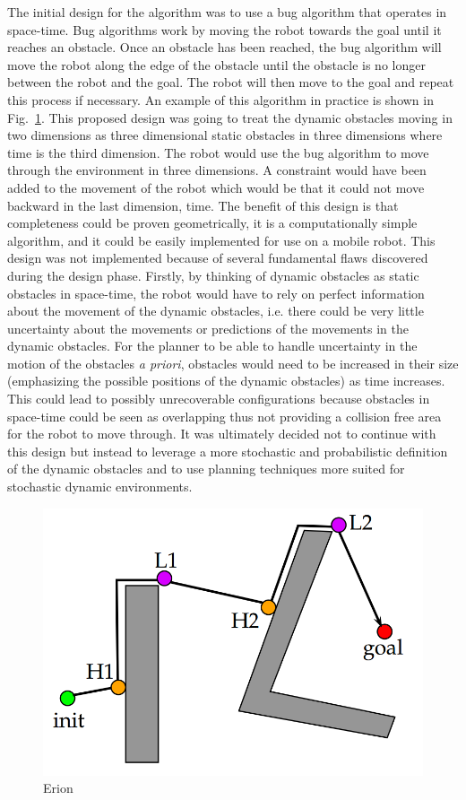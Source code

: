 The initial design for the algorithm was to use a bug algorithm that operates
in space-time. Bug algorithms work by moving the robot towards the goal until
it reaches an obstacle. Once an obstacle has been reached, the bug algorithm
will move the robot along the edge of the obstacle until the obstacle is no
longer between the robot and the goal. The robot will then move to the goal and
repeat this process if necessary. An example of this algorithm in practice is
shown in Fig.~\ref{fig:bug}. This proposed design was going to treat the
dynamic obstacles moving in two dimensions as three dimensional static
obstacles in three dimensions where time is the third dimension. The robot
would use the bug algorithm to move through the environment in three
dimensions. A constraint would have been added to the movement of the robot
which would be that it could not move backward in the last dimension, time.
The benefit of this design is that completeness could be proven geometrically,
it is a computationally simple algorithm, and it could be easily implemented
for use on a mobile robot. This design was not implemented because of several
fundamental flaws discovered during the design phase. Firstly, by thinking of
dynamic obstacles as static obstacles in space-time, the robot would have to
rely on perfect information about the movement of the dynamic obstacles, i.e.
there could be very little uncertainty about the movements or predictions of
the movements in the dynamic obstacles. For the planner to be able to handle
uncertainty in the motion of the obstacles \emph{a priori}, obstacles would
need to be increased in their size (emphasizing the possible positions of the
dynamic obstacles) as time increases. This could lead to possibly unrecoverable
configurations because obstacles in space-time could be seen as overlapping
thus not providing a collision free area for the robot to move through. It was
ultimately decided not to continue with this design but instead to leverage a
more stochastic and probabilistic definition of the dynamic obstacles and to
use planning techniques more suited for stochastic dynamic environments.

\begin{figure}[h!]

    \centering

    \includegraphics[width=0.7\linewidth]{figs/bug}

    \caption{Erion}

    \label{fig:bug}

\end{figure}

